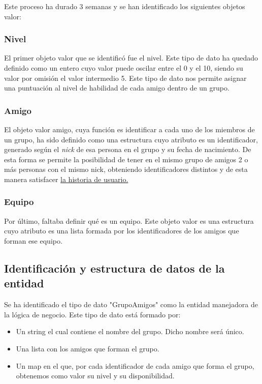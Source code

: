 Este proceso ha durado 3 semanas y se han identificado los siguientes objetos valor:

\subsubsection{Nivel}

El primer objeto valor que se identificó fue el nivel.
Este tipo de dato ha quedado definido como un entero cuyo valor puede oscilar entre el 0 y el 10, siendo su valor por omisión el valor intermedio 5.
Este tipo de dato nos permite asignar una puntuación al nivel de habilidad de cada amigo dentro de un grupo.

\subsubsection{Amigo}

El objeto valor amigo, cuya función es identificar a cada uno de los miembros de un grupo, ha sido definido como una estructura cuyo atributo es un identificador, generado según el \textit{nick}
 de esa persona en el grupo y su fecha de nacimiento. De esta forma se permite la posibilidad de tener en el mismo grupo de amigos 2 o más personas con el mismo nick, obteniendo identificadores distintos
 y de esta manera satisfacer \href{https://github.com/manujurado1/SportsBar-IV/issues/119}{la historia de usuario.}


\subsubsection{Equipo}

Por último, faltaba definir qué es un equipo. Este objeto valor es una estructura cuyo atributo es una lista formada por los identificadores de los amigos que forman ese equipo.

\subsection{Identificación y estructura de datos de la entidad}
Se ha identificado el tipo de dato "GrupoAmigos" como la entidad manejadora de la lógica de negocio.
Este tipo de dato está formado por:

\begin{itemize}
    \item Un string el cual contiene el nombre del grupo. Dicho nombre será único.
    \item Una lista con los amigos que forman el grupo.
    \item Un map en el que, por cada identificador de cada amigo que forma el grupo, obtenemos como valor su nivel y su disponibilidad.
\end{itemize}


